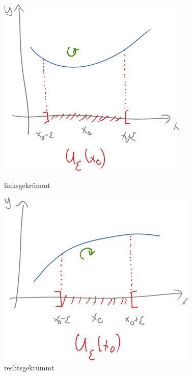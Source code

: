 \begin{figure}[h!]
	\centering
	\begin{minipage}{0.4\linewidth}
		\centering\includegraphics[width=\linewidth]{Bilder/153}
		\caption{linksgekrümmt}
	\end{minipage}
	\qquad
	\begin{minipage}{0.4\linewidth}
		\centering\includegraphics[width=\linewidth]{Bilder/154}
		\caption{rechtsgekrümmt}
	\end{minipage}
\end{figure}

